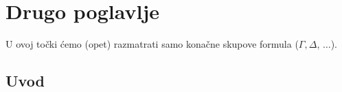 
\chapter{Drugo poglavlje}%
\label{poglavlje:semanticki_pristup}


U ovoj točki ćemo (opet) razmatrati samo konačne skupove formula ($\Gamma, \Delta$, $\dots$).





\section{Uvod}
% 
